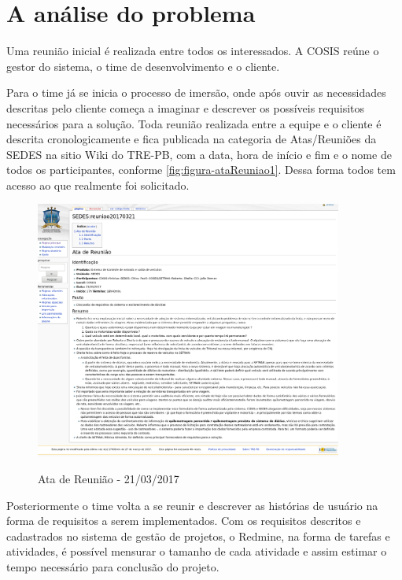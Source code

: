 \section{A análise do problema}
\label{sec:atividadesRealizadasInicio}

Uma reunião inicial é realizada entre todos os interessados. A COSIS reúne o gestor do sistema, o time de desenvolvimento e o cliente. 

Para o time já se inicia o processo de imersão, onde após ouvir as necessidades descritas pelo cliente começa a imaginar e descrever os possíveis requisitos necessários para a solução. 
Toda reunião realizada entre a equipe e o cliente é descrita cronologicamente e fica publicada na categoria de Atas/Reuniões da SEDES na sitio Wiki do TRE-PB, com a data, hora de início e fim e o nome de todos os participantes, conforme \autoref{fig:figura-ataReuniao1}. Dessa forma todos tem acesso ao que realmente foi solicitado.

\begin{figure}[!htb]
    \centering
    \caption{Ata de Reunião - 21/03/2017}
    \includegraphics[width=0.9\textwidth]{dados/figuras/veiculos-reuniao20170321}
    \label{fig:figura-ataReuniao1}
\end{figure}

Posteriormente o time volta a se reunir e descrever as histórias de usuário na forma de requisitos a serem implementados. Com os requisitos descritos e cadastrados no sistema de gestão de projetos, o Redmine, na forma de tarefas e atividades, é possível mensurar o tamanho de cada atividade e assim estimar o tempo necessário para conclusão do projeto.  

